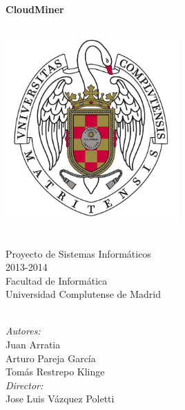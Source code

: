 \begin{titlepage}
\begin{center}




\HRule \\[0.4cm]
{ \huge \bfseries CloudMiner \\[0.4cm] }

\HRule \\[1.2cm]

\includegraphics[width=0.5\textwidth]{./logoucm}

~\\

\Large Proyecto de Sistemas Inform\'aticos\\
\Large 2013-2014\\
\Large Facultad de Inform\'atica\\
\Large Universidad Complutense de Madrid

~\\

\emph{Autores:}\\
Juan Arratia \\ Arturo Pareja Garc\'ia \\ Tom\'as Restrepo Klinge \\[1.0cm]
\emph{Director:} \\
Jose Luis V\'azquez Poletti

\vfill


\end{center}
\end{titlepage}